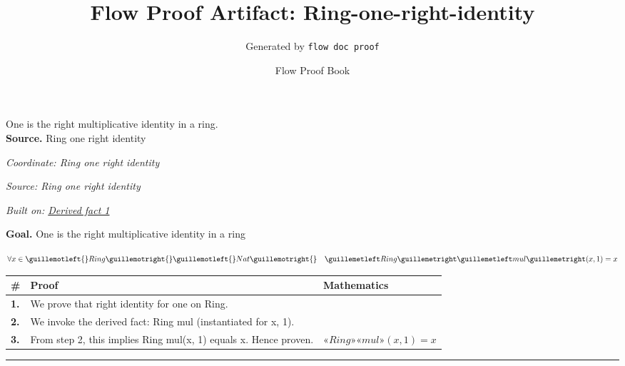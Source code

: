 \documentclass[11pt]{article}
\title{Flow Proof Artifact: Ring-one-right-identity}
\author{Generated by \texttt{flow doc proof}}
\date{Flow Proof Book}
\theoremstyle{definition}
\begin{document}
\maketitle
One is the right multiplicative identity in a ring.\\[0.5em]
\textbf{Source.} Ring one right identity\\[0.5em]
\bigskip
{}\par
\smallskip\noindent\textit{Coordinate: Ring \cdot one \cdot right identity}\par
\smallskip\noindent\textit{Source: Ring one right identity}\par
\smallskip\noindent\textit{Built on: \hyperref[thm:Ring-one-right_identity]{Derived fact 1}}\par
\medskip
\noindent\textbf{Goal.} One is the right multiplicative identity in a ring\par
\noindent$\displaystyle \forall x \in \guillemotleft{}Ring\guillemotright{} \guillemotleft{}Nat\guillemotright{}\quad «Ring» «mul»(x, 1) = x$\par
\medskip
\noindent
\begin{tabular}{@{} >{\raggedright\arraybackslash}p{} >{\raggedright\arraybackslash}p{} >{\raggedleft\arraybackslash}p{} @{}}
\textbf{\#} & \textbf{Proof} & \textbf{Mathematics} \\
\midrule
\textbf{1.} & We prove that right identity for one on Ring. & \\[0.45em]
\textbf{2.} & We invoke the derived fact: \guillemotleft{}Ring\guillemotright{} \guillemotleft{}mul\guillemotright{} (instantiated for x, 1). & \\[0.45em]
\textbf{3.} & From step 2, this implies \guillemotleft{}Ring\guillemotright{} \guillemotleft{}mul\guillemotright{}(x, 1) equals x. Hence proven. & $\displaystyle «Ring» «mul»(x, 1) = x$ \\[0.45em]
\bottomrule
\end{tabular}
\label{thm:Ring-one-right_identity}
\par\medskip\hrule
\end{document}
